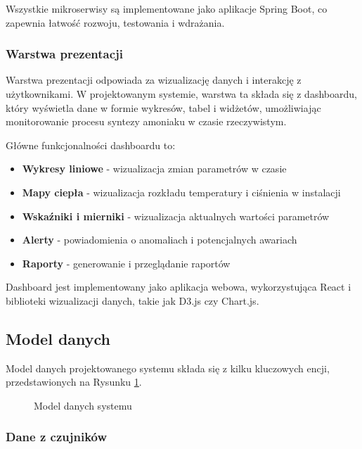 Wszystkie mikroserwisy są implementowane jako aplikacje Spring Boot, co zapewnia łatwość rozwoju, testowania i wdrażania.

\subsubsection{Warstwa prezentacji}
\label{subsubsec:warstwa_prezentacji}

Warstwa prezentacji odpowiada za wizualizację danych i interakcję z użytkownikami. W projektowanym systemie, warstwa ta składa się z dashboardu, który wyświetla dane w formie wykresów, tabel i widżetów, umożliwiając monitorowanie procesu syntezy amoniaku w czasie rzeczywistym.

Główne funkcjonalności dashboardu to:

\begin{itemize}
    \item \textbf{Wykresy liniowe} - wizualizacja zmian parametrów w czasie
    \item \textbf{Mapy ciepła} - wizualizacja rozkładu temperatury i ciśnienia w instalacji
    \item \textbf{Wskaźniki i mierniki} - wizualizacja aktualnych wartości parametrów
    \item \textbf{Alerty} - powiadomienia o anomaliach i potencjalnych awariach
    \item \textbf{Raporty} - generowanie i przeglądanie raportów
\end{itemize}

Dashboard jest implementowany jako aplikacja webowa, wykorzystująca React i biblioteki wizualizacji danych, takie jak D3.js czy Chart.js.

\subsection{Model danych}
\label{subsec:model_danych}

Model danych projektowanego systemu składa się z kilku kluczowych encji, przedstawionych na Rysunku \ref{fig:model_danych}.

\begin{figure}[h]
    \centering
    \caption{Model danych systemu}
    \label{fig:model_danych}
\end{figure}

\subsubsection{Dane z czujników}
\label{subsubsec:dane_czujnikow}

